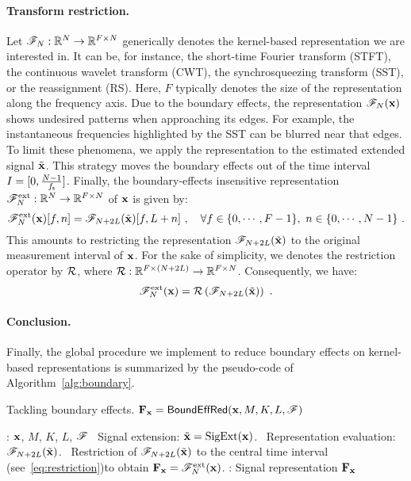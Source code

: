 \paragraph{Transform restriction.} 
Let ${\mathscr F}_{N}:{\mathbb R}^{N}\to{\mathbb R}^{F\times N}$ generically denotes the kernel-based representation we are interested in. It can be, for instance, the short-time Fourier transform (STFT), the continuous wavelet transform (CWT), the synchrosqueezing transform (SST), or the reassignment (RS). Here, $F$ typically denotes the size of the representation along the frequency axis. Due to the boundary effects, the representation ${\mathscr F}_{N}({\mathbf x})$ shows undesired patterns when approaching its edges. For example, the instantaneous frequencies highlighted by the SST can be blurred near that edges. To limit these phenomena, we apply the representation to the estimated extended signal $\tilde{{\mathbf x}}$. This strategy moves the boundary effects out of the time interval $I=[0, \frac{N-1}{f_{\mathsf s}}]$. Finally, the boundary-effects insensitive representation ${\mathscr F}_N^{\mathrm{ext}}:{\mathbb R}^{N}\to{\mathbb R}^{F\times N}$ of ${\mathbf x}$ is given by:
\begin{equation}
\ccF_N^{\mathrm{ext}}(\bx)[f,n] = \ccF_{N+2L}(\tilde \bx)[f,L+n]\ ,\quad\forall f\in\{0,\cdots,F-1\},\ n\in\{0,\cdots,N-1\}\ .
\label{eq:restriction}
\end{equation}
This amounts to restricting the representation ${\mathscr F}_{N+2L}(\tilde {{\mathbf x}})$ to the original measurement interval of ${\mathbf x}$. For the sake of simplicity, we denotes the restriction operator by ${\mathcal R}$, where ${\mathcal R}:{\mathbb R}^{F\times (N+2L)}\to{\mathbb R}^{F\times N}$. Consequently, we have:
\begin{equation*}
{\mathscr F}_N^{\mathrm{ext}}({\mathbf x}) = {\mathcal R}\left( {\mathscr F}_{N+2L}(\tilde {{\mathbf x}}) \right) \ .
\end{equation*}

\paragraph{Conclusion.}
Finally, the global procedure we implement to reduce boundary effects on kernel-based representations is summarized by the pseudo-code of Algorithm~\ref{alg:boundary}.

\begin{algorithm}
\caption{Tackling boundary effects. ${\mathbf F}_{\mathbf x} = \mathsf{BoundEffRed(}{\mathbf x},M,K,L,{\mathscr F})$}
\label{alg:boundary}
\begin{algorithmic}
: ${\mathbf x}$, $M$, $K$, $L$, ${\mathscr F}$
\STATE 
{}
\STATE \quad\textbullet\ Signal extension: $\tilde{{\mathbf x}} = \mathrm{SigExt}({\mathbf x})$.
\STATE 
{}
\STATE \quad\textbullet\ Representation evaluation: ${\mathscr F}_{N+2L}(\tilde{{\mathbf x}})$.
\STATE \quad\textbullet\ Restriction of ${\mathscr F}_{N+2L}(\tilde{{\mathbf x}})$ to the central time interval (see~\eqref{eq:restriction})to obtain ${\mathbf F}_{\mathbf x}={\mathscr F}_N^{\mathrm{ext}}({\mathbf x})$.
\STATE 
{}: Signal representation ${\mathbf F}_{\mathbf x}$
\end{algorithmic}
\end{algorithm}